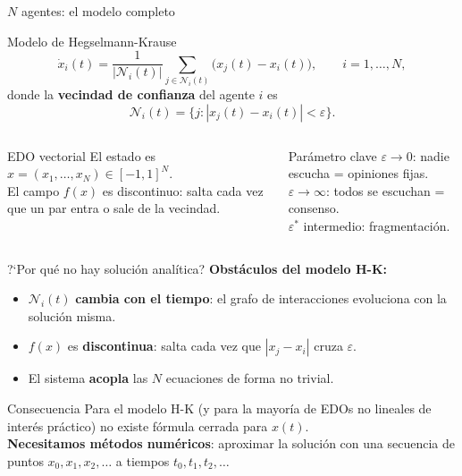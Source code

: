 \documentclass[aspectratio=169,10pt]{beamer}
\begin{document}
\begin{frame}{$N$ agentes: el modelo completo}
\vspace{4pt}
\begin{defbox}{Modelo de Hegselmann-Krause}
\[
  \dot{x}_i(t)
  = \frac{1}{|\mathcal{N}_i(t)|}
    \sum_{j\in\mathcal{N}_i(t)}\!\bigl(x_j(t)-x_i(t)\bigr),
  \qquad i=1,\ldots,N,
\]
donde la \textbf{vecindad de confianza} del agente $i$ es
\[
  \mathcal{N}_i(t) = \bigl\{j : |x_j(t)-x_i(t)|<\varepsilon\bigr\}.
\]
\end{defbox}

\vspace{6pt}
\begin{columns}[T]
\begin{obsbox}{EDO vectorial}
El estado es $x=(x_1,\ldots,x_N)\in[-1,1]^N$.\\[3pt]
El campo $f(x)$ es discontinuo: salta cada vez que un
par entra o sale de la vecindad.
\end{obsbox}

\begin{obsbox}{Par\'ametro clave}
$\varepsilon\to 0$: nadie escucha = opiniones fijas.\\[3pt]
$\varepsilon\to\infty$: todos se escuchan = consenso.\\[3pt]
$\varepsilon^*$ intermedio: fragmentaci\'on.
\end{obsbox}
\end{columns}
\end{frame}

\begin{frame}{?`Por qu\'e no hay soluci\'on anal\'itica?}
\vspace{4pt}
\textbf{Obst\'aculos del modelo H-K:}
\begin{itemize}\small
  \item $\mathcal{N}_i(t)$ \textbf{cambia con el tiempo}: el grafo de
        interacciones evoluciona con la soluci\'on misma.
  \item $f(x)$ es \textbf{discontinua}: salta cada vez que $|x_j-x_i|$
        cruza $\varepsilon$.
  \item El sistema \textbf{acopla} las $N$ ecuaciones de forma no trivial.
\end{itemize}

\vspace{10pt}
\begin{resultbox}{Consecuencia}
Para el modelo H-K (y para la mayor\'ia de EDOs no lineales de
inter\'es pr\'actico) no existe f\'ormula cerrada para $x(t)$.\\[4pt]
\textbf{Necesitamos m\'etodos num\'ericos}: aproximar la soluci\'on con
una secuencia de puntos $x_0,x_1,x_2,\ldots$ a tiempos
$t_0,t_1,t_2,\ldots$
\end{resultbox}
\end{frame}
\end{document}
